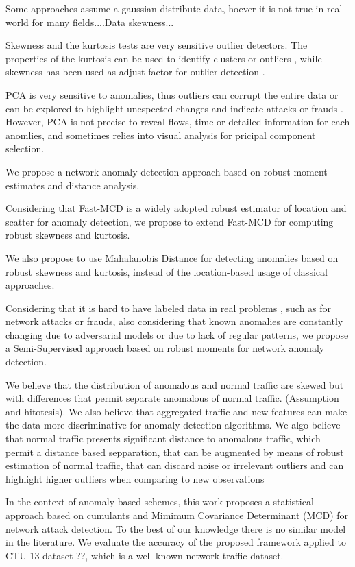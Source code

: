 \documentclass[review]{elsarticle}
\begin{document}
Some approaches assume a gaussian distribute data, hoever it is not true in real world for many fields....Data skewness...

Skewness and the kurtosis tests are very sensitive outlier detectors. The properties of the kurtosis can be used to identify clusters or outliers \cite{pena2010eigenvectors}, while skewness has been used as adjust factor for outlier detection \cite{hubert2009robustskewed}.

PCA is very sensitive to anomalies, thus outliers can corrupt the entire data or can be explored to highlight unespected changes and indicate attacks or frauds \cite{callegari2011novel,Lee2013,vieira2017model}. However, PCA is not precise to reveal flows, time or detailed information for each anomlies, and sometimes relies into visual analysis for pricipal component selection.

We propose a network anomaly detection approach based on robust moment estimates and distance analysis.

Considering that Fast-MCD is a widely adopted robust estimator of location and scatter for anomaly detection, we propose to extend Fast-MCD for computing robust skewness and kurtosis.

We also propose to use Mahalanobis Distance for detecting anomalies based on robust skewness and kurtosis, instead of the location-based usage of classical approaches.

Considering that it is hard to have labeled data in real problems \cite{osanaiye2016distributed}, such as for network attacks or frauds, also considering that known anomalies are constantly changing due to adversarial models or due to lack of regular patterns, we propose a Semi-Supervised approach based on robust moments for network anomaly detection.

We believe that the distribution of anomalous and normal traffic are skewed but with differences that permit separate anomalous of normal traffic. (Assumption and hitotesis). We also believe that aggregated traffic and new features can make the data more discriminative for anomaly detection algorithms. We algo believe that normal traffic presents significant distance to anomalous traffic, which permit a distance based sepparation, that can be augmented by means of robust estimation of normal traffic, that can discard noise or irrelevant outliers and can highlight higher outliers when comparing to new observations

In the context of anomaly-based schemes, this work proposes a statistical approach based on cumulants and Mimimum Covariance Determinant (MCD) for network attack detection. To the best of our knowledge there is no similar model in the literature. We evaluate the accuracy of the proposed framework applied to CTU-13 dataset ??, which is a well known network traffic dataset.
\end{document}
